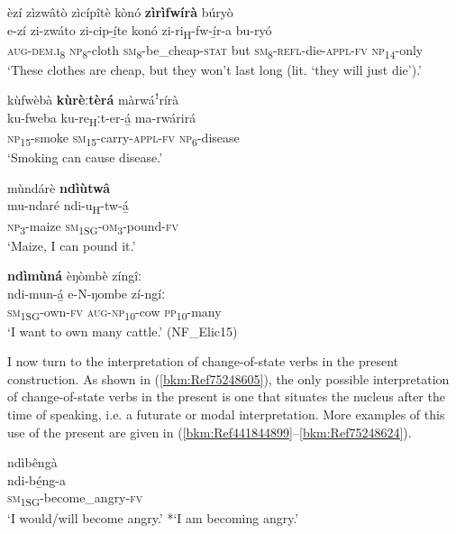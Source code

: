 \ea
\label{bkm:Ref75249269}
èzí zìzwâtò zìcípîtè kònó \textbf{zìrìfwírà} búryò\\
\gll e-zí    zi-zwáto  zi-cip-í̲te konó  zi-ri\textsubscript{H}-fw-í̲r-a    bu-ryó\\
\textsc{aug}-\textsc{dem}.\textsc{i}\textsubscript{8}  \textsc{np}\textsubscript{8}-cloth  \textsc{sm}\textsubscript{8}-be\_cheap-\textsc{stat}
but  \textsc{sm}\textsubscript{8}-\textsc{refl}-die-\textsc{appl}-\textsc{fv}  \textsc{np}\textsubscript{14}-only\\
\glt ‘These clothes are cheap, but they won’t last long (lit. ‘they will just die’).’
\z

\ea
kùfwèbà \textbf{kùrèːtèrá} màrwáꜝrírà\\
\gll ku-fweba  ku-re\textsubscript{H}ːt-er-á̲  ma-rwárirá\\
\textsc{np}\textsubscript{15}-smoke  \textsc{sm}\textsubscript{15}-carry-\textsc{appl}-\textsc{fv}  \textsc{np}\textsubscript{6}-disease\\
\glt ‘Smoking can cause disease.’
\z

\ea
mùndárè \textbf{ndìùtwâ}\\
\gll mu-ndaré  ndi-u\textsubscript{H}-tw-á̲\\
\textsc{np}\textsubscript{3}-maize  \textsc{sm}\textsubscript{1SG}-\textsc{om}\textsubscript{3}-pound-\textsc{fv}\\
\glt ‘Maize, I can pound it.’
\z

\ea
\label{bkm:Ref75249272}
\textbf{ndìmùná} èŋòmbè zíngîː\\
\gll ndi-mun-á̲    e-N-ŋombe    zí-ngíː\\
\textsc{sm}\textsubscript{1SG}-own-\textsc{fv}  \textsc{aug}-\textsc{np}\textsubscript{10}-cow  \textsc{pp}\textsubscript{10}-many\\
\glt ‘I want to own many cattle.’ (NF\_Elic15)
\z

I now turn to the interpretation of change-of-state verbs in the present construction. As shown in (\ref{bkm:Ref75248605}), the only possible interpretation of change-of-state verbs in the present is one that situates the nucleus after the time of speaking, i.e. a futurate or modal interpretation. More examples of this use of the present are given in (\ref{bkm:Ref441844899}--\ref{bkm:Ref75248624}).

\ea
\label{bkm:Ref441844899}
\glll ndìbêngà\\
ndi-bé̲ng-a\\
\textsc{sm}\textsubscript{1SG}-become\_angry-\textsc{fv}\\
\glt ‘I would/will become angry.’ *‘I am becoming angry.’
\z


